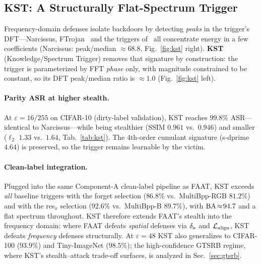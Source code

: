 \subsection{KST: A Structurally Flat-Spectrum Trigger}
\label{sec:kst}




Frequency-domain defenses isolate backdoors by detecting \emph{peaks} in the
trigger's DFT---Narcissus, FTrojan~\cite{wang2021ftrojan} and the triggers
of~\cite{zeng2021frequency} all concentrate energy in a few coefficients
(Narcissus: peak/median $\approx\!68.8$, Fig.~\ref{fig:kst} right). \textbf{KST}
(Knowledge/Spectrum Trigger) removes that signature by construction: the
trigger is parameterized by FFT
\emph{phase} only, with magnitude constrained to be constant, so its DFT
peak/median ratio is $\approx\!1.0$ (Fig.~\ref{fig:kst} left).

\paragraph{Parity ASR at higher stealth.}
At $\varepsilon\!=\!16/255$ on CIFAR-10 (dirty-label validation), KST reaches
$99.8\%$ ASR---identical to Narcissus---while being stealthier (SSIM $0.961$ vs.\
$0.946$) and smaller ($\ell_2$ $1.33$ vs.\ $1.64$, Tab.~\ref{tab:kst}). The
4th-order cumulant signature (s-dprime $4.64$) is preserved, so the trigger
remains learnable by the victim.

\paragraph{Clean-label integration.}
Plugged into the same Component-A clean-label pipeline as FAAT, KST exceeds
\emph{all} baseline triggers with the forget selection
($86.8\%$ vs.\ MultiBpp-RGB $81.2\%$) and with the res$_x$ selection
($92.6\%$ vs.\ MultiBpp-B $89.7\%$), with $\mathrm{BA}\!\approx\!94.7$ and a flat
spectrum throughout. KST therefore extends FAAT's stealth into the frequency
domain: where FAAT defeats \emph{spatial} defenses via $\delta_{\mathrm{a}}$ and $\mathcal{L}_{\mathrm{align}}$,
KST defeats \emph{frequency} defenses structurally. At $\varepsilon\!=\!48$ KST
also generalizes to CIFAR-100 ($93.9\%$) and Tiny-ImageNet ($98.5\%$); the
high-confidence GTSRB regime, where KST's stealth--attack trade-off surfaces, is
analyzed in Sec.~\ref{sec:gtsrb}.
